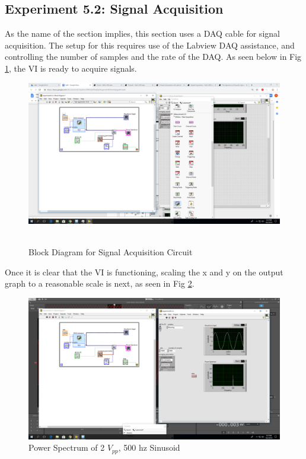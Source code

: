 \documentclass[10pt]{article}
\begin{document}
\subsection{Experiment 5.2: Signal Acquisition}

As the name of the section implies, this section uses a DAQ cable for signal acquisition. The setup for this requires use of the Labview DAQ assistance, and controlling the number of samples and the rate of the DAQ. As seen below in Fig \ref{fig:52block}, the VI is ready to acquire signals.

\begin{centering}
	\begin{figure} [H]
		\centering
		\includegraphics[scale=0.22]{images/52modifiedblock.png}\
		\caption{Block Diagram for Signal Acquisition Circuit}
		\label{fig:52block}
	\end{figure}
\end{centering}

Once it is clear that the VI is functioning, scaling the x and y on the output graph to a reasonable scale is next, as seen in Fig \ref{fig:2vpp500hz}. 

\begin{centering}
	\begin{figure} [H]
		\centering
		\includegraphics[scale=0.22]{images/2vpp500hz.png}
		\caption{Power Spectrum of 2 $V_{pp}$, 500 hz Sinusoid}
		\label{fig:2vpp500hz}
	\end{figure}
\end{centering}
\end{document}
